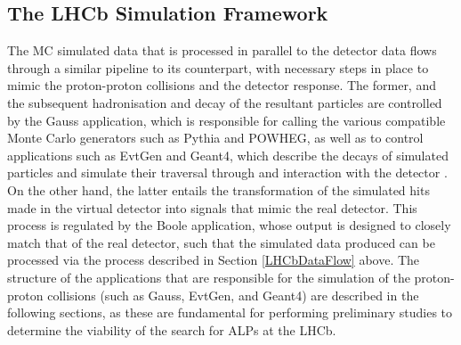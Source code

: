 \subsection{The LHCb Simulation Framework}
The MC simulated data that is processed in parallel to the detector data flows through a similar pipeline to its counterpart, with necessary steps in place to mimic the proton-proton collisions and the detector response. The former, and the subsequent hadronisation and decay of the resultant particles 
are controlled by the Gauss application, which is responsible for calling the various compatible Monte Carlo generators such as Pythia and POWHEG, as well as to control applications such as EvtGen and Geant4, which describe the decays of simulated particles and simulate their traversal through and interaction with
the detector \cite{LHCbSK}. On the other hand, the latter entails the transformation of the simulated hits made in the virtual detector into signals that mimic the real detector. This process is regulated by the Boole application, whose output is designed to closely match that of the real detector, such that the simulated data produced can be 
processed via the process described in Section \ref{LHCbDataFlow} above. The structure of the applications that are responsible for the simulation of the proton-proton collisions (such as Gauss, EvtGen, and Geant4) are described in the following sections, as these are fundamental for performing preliminary studies to determine the viability of the search for ALPs at the
LHCb.
